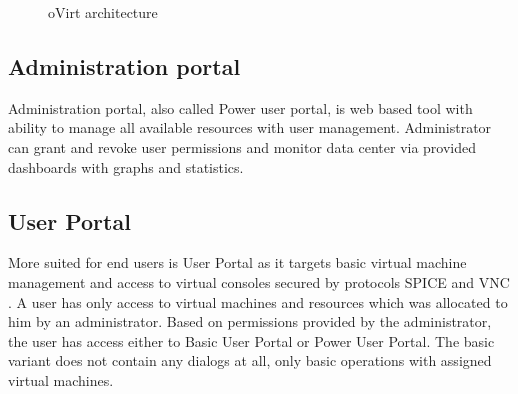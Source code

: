 \begin{figure}[h]
\caption{oVirt architecture \cite{oVirtImg}}
\label{ovirt_architecture}
\end{figure}

\subsection{Administration portal}
Administration portal, also called Power user portal, is web based tool with ability to manage all available resources with user management. Administrator can grant and revoke user permissions and monitor data center via provided dashboards with graphs and statistics. 

\subsection{User Portal}\label{userportal}
More suited for end users is User Portal as it targets basic virtual machine management and access to virtual consoles secured by protocols SPICE \cite{SPICE} and VNC \cite{VNC}. A user has only access to virtual machines and resources which was allocated to him by an administrator. Based on permissions provided by the administrator, the user has access either to Basic User Portal or Power User Portal. The basic variant does not contain any dialogs at all, only basic operations with assigned virtual machines.

